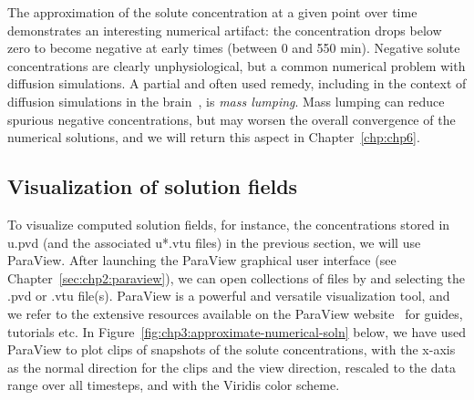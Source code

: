 The approximation of the solute concentration at a given point over
time demonstrates an interesting numerical artifact: the concentration
drops below zero to become negative at early times (between 0 and 550
min). Negative solute concentrations are clearly unphysiological, but
a common numerical problem with diffusion simulations. A partial and
often used remedy, including in the context of diffusion simulations
in the brain~\cite{croci2019uncertainty}, is \emph{mass lumping}. Mass
lumping can reduce spurious negative concentrations, but may worsen
the overall convergence of the numerical solutions, and we will return
this aspect in Chapter~\ref{chp:chp6}.

\subsection{Visualization of solution fields}
To visualize computed solution fields, for instance, the
concentrations stored in u.pvd (and the associated u*.vtu files) in
the previous section, we will use ParaView. After launching the
ParaView graphical user interface (see
Chapter~\ref{sec:chp2:paraview}), we can open collections of files
by  and selecting the .pvd or .vtu
file(s). ParaView is a powerful and versatile visualization tool, and
we refer to the extensive resources available on the ParaView
website~\cite{paraview:web} for guides, tutorials etc. In
Figure~\ref{fig:chp3:approximate-numerical-soln} below, we have used
ParaView to plot clips of snapshots of the solute
concentrations, with the x-axis as the normal direction for the clips
and the view direction, rescaled to the data range over all
  timesteps, and with the Viridis color scheme.
